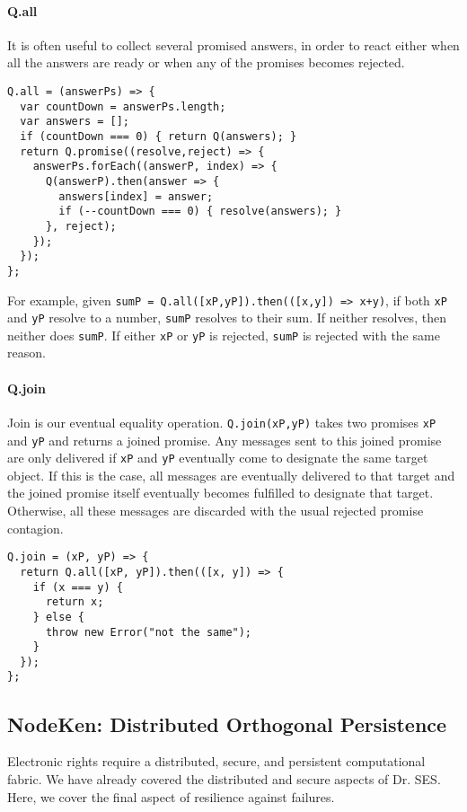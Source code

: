 \documentclass{llncs}
\begin{document}
\paragraph{Q.all} It is often useful to collect several promised answers, in order to react either when all the answers are ready or when any of the promises becomes rejected.

\begin{verbatim}
Q.all = (answerPs) => {
  var countDown = answerPs.length;
  var answers = [];
  if (countDown === 0) { return Q(answers); }
  return Q.promise((resolve,reject) => {
    answerPs.forEach((answerP, index) => {
      Q(answerP).then(answer => {
        answers[index] = answer;
        if (--countDown === 0) { resolve(answers); }
      }, reject);
    });
  });
};  
\end{verbatim}

For example, given \texttt{sumP = Q.all([xP,yP]).then(([x,y]) => x+y)}, if both \texttt{xP} and \texttt{yP} resolve to a number, \texttt{sumP} resolves to their sum. If neither resolves, then neither does \texttt{sumP}. If either \texttt{xP} or \texttt{yP} is rejected, \texttt{sumP} is rejected with the same reason.

\paragraph{Q.join} Join is our eventual equality operation. \texttt{Q.join(xP,yP)} takes two promises \texttt{xP} and \texttt{yP} and returns a joined promise. Any messages sent to this joined promise are only delivered if \texttt{xP} and \texttt{yP} eventually come to designate the same target object. If this is the case, all messages are eventually delivered to that target and the joined promise itself eventually becomes fulfilled to designate that target. Otherwise, all these messages are discarded with the usual rejected promise contagion.

\begin{verbatim}
Q.join = (xP, yP) => {
  return Q.all([xP, yP]).then(([x, y]) => {
    if (x === y) {
      return x;
    } else {
      throw new Error("not the same");
    }
  });
};
\end{verbatim}

\subsection{NodeKen: Distributed Orthogonal Persistence}

Electronic rights require a distributed, secure, and persistent computational fabric.
We have already covered the distributed and secure aspects of Dr. SES. Here, we cover the final aspect of resilience against failures.
\end{document}
